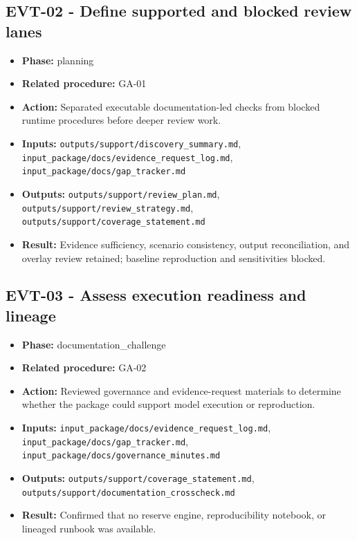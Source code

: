 \documentclass[11pt]{article}
\begin{document}
\subsection*{EVT-02 - Define supported and blocked review lanes}
\begin{itemize}
\item \textbf{Phase:} planning
\item \textbf{Related procedure:} GA-01
\item \textbf{Action:} Separated executable documentation-led checks from blocked runtime procedures before deeper review work.
\item \textbf{Inputs:} \texttt{outputs/support/discovery\_summary.md}, \texttt{input\_package/docs/evidence\_request\_log.md}, \texttt{input\_package/docs/gap\_tracker.md}
\item \textbf{Outputs:} \texttt{outputs/support/review\_plan.md}, \texttt{outputs/support/review\_strategy.md}, \texttt{outputs/support/coverage\_statement.md}
\item \textbf{Result:} Evidence sufficiency, scenario consistency, output reconciliation, and overlay review retained; baseline reproduction and sensitivities blocked.
\end{itemize}
\subsection*{EVT-03 - Assess execution readiness and lineage}
\begin{itemize}
\item \textbf{Phase:} documentation\_challenge
\item \textbf{Related procedure:} GA-02
\item \textbf{Action:} Reviewed governance and evidence-request materials to determine whether the package could support model execution or reproduction.
\item \textbf{Inputs:} \texttt{input\_package/docs/evidence\_request\_log.md}, \texttt{input\_package/docs/gap\_tracker.md}, \texttt{input\_package/docs/governance\_minutes.md}
\item \textbf{Outputs:} \texttt{outputs/support/coverage\_statement.md}, \texttt{outputs/support/documentation\_crosscheck.md}
\item \textbf{Result:} Confirmed that no reserve engine, reproducibility notebook, or lineaged runbook was available.
\end{itemize}
\end{document}
